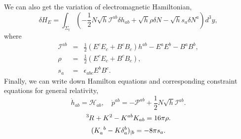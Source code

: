 We can also get the variation of electromagnetic Hamiltonian,
\[\delta H_E = \int_{\Sigma_t}\left(-\frac{1}{2}N\sqrt{h}\mathcal{I}^{ab} \delta h_{ab} + \sqrt{h} \rho \delta N - \sqrt{h} s_a \delta N^a\right) d^3 y,\]
where
\begin{eqnarray}
\mathcal{I}^{ab} &=& \frac{1}{2}(E^c E_c + B^c B_c)h^{ab} - E^a E^b - B^a B^b, \nonumber \\
\rho &=& \frac{1}{2}(E^c E_c + B^c B_c) ,\nonumber \\
s_a &=& \epsilon_{abc} E^b B^c .\nonumber
\end{eqnarray}
Finally, we can write down Hamilton equations and corresponding constraint equations for general relativity,
\[\dot{h}_{ab} = \mathcal{H}_{ab}, \quad \dot{p}^{ab} = -\mathcal{P}^{ab}+\frac{1}{2}N\sqrt{h}\mathcal{I}^{ab}.\]
\[\tensor[^3]{R}{} + K^2 - K^{ab}K_{ab} = 16 \pi \rho.\]
\[(\tensor{K}{_a^{b}} - K \delta_a^{b})_{|b} = -8\pi s_a.\]
